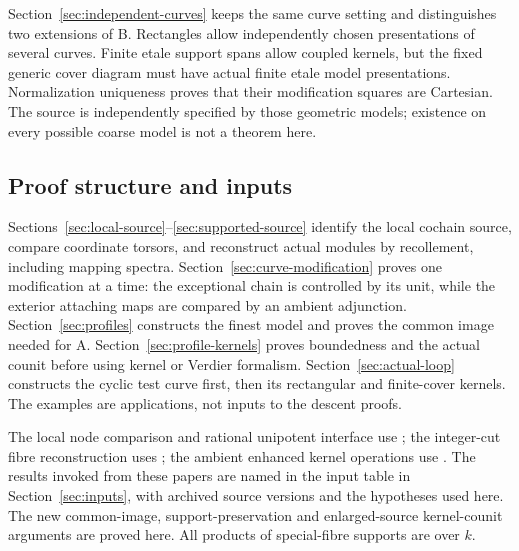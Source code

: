 \documentclass[11pt]{article}
\theoremstyle{definition}
\theoremstyle{remark}
\begin{document}
Section~\ref{sec:independent-curves} keeps the same curve setting
and distinguishes two extensions of B. Rectangles allow independently
chosen presentations of several curves. Finite etale support spans
allow coupled kernels, but the fixed generic cover diagram must
have actual finite etale model presentations. Normalization
uniqueness proves that their modification squares are Cartesian.
The source is independently specified by those geometric models;
existence on every possible coarse model is not a theorem here.

\subsection{Proof structure and inputs}
Sections~\ref{sec:local-source}--\ref{sec:supported-source}
identify the local cochain source, compare coordinate torsors, and
reconstruct actual modules by recollement, including mapping spectra.
Section~\ref{sec:curve-modification} proves one modification at a
time: the exceptional chain is controlled by its unit, while the
exterior attaching maps are compared by an ambient adjunction.
Section~\ref{sec:profiles} constructs the finest model and proves
the common image needed for A. Section~\ref{sec:profile-kernels}
proves boundedness and the actual counit before using kernel or
Verdier formalism. Section~\ref{sec:actual-loop} constructs the
cyclic test curve first, then its rectangular and finite-cover kernels.
The examples are applications, not inputs to the descent proofs.

The local node comparison and rational unipotent interface use
\cite{Local}; the integer-cut fibre reconstruction uses
\cite{Refinement}; the ambient enhanced kernel operations use
\cite{Kernels}. The results invoked from these papers are named
in the input table in Section~\ref{sec:inputs}, with archived source
versions and the hypotheses used here. The new common-image,
support-preservation and enlarged-source kernel-counit arguments
are proved here. All products of
special-fibre supports are over $k$.
\end{document}
